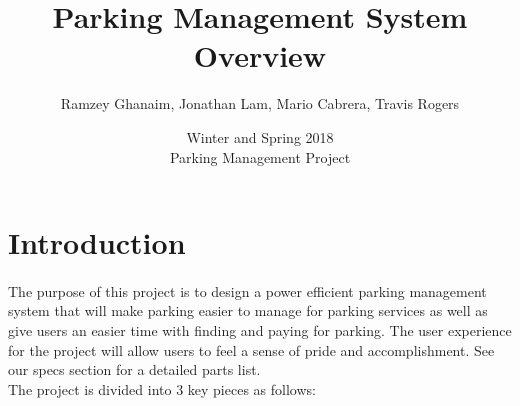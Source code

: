 \documentclass{article}
\begin{document}
\title{Parking Management System Overview}
\author{Ramzey Ghanaim, Jonathan Lam, Mario Cabrera, Travis Rogers} 
\date{Winter and Spring 2018 \\ Parking Management Project} \maketitle

\clearpage
\tableofcontents
\clearpage

\section{Introduction}
\paragraph*{}
The purpose of this project is to design a power efficient parking management 
system that will make parking easier to manage for parking services as well as give users an easier time with finding and paying for parking. The user experience for the project will allow users to feel a sense of pride and accomplishment. See our specs section for a detailed parts list.\\

The project is divided into 3 key pieces as follows:
\end{document}
